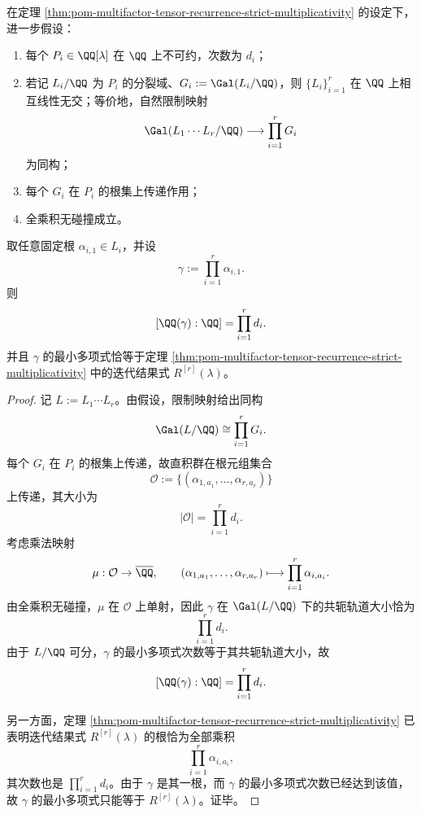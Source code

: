 \begin{theorem}\label{thm:pom-tensor-product-root-galois-degree-rigidity}
在定理 \ref{thm:pom-multifactor-tensor-recurrence-strict-multiplicativity} 的设定下，进一步假设：
\begin{enumerate}
  \item 每个 \(P_i\in\QQ[\lambda]\) 在 \(\QQ\) 上不可约，次数为 \(d_i\)；
  \item 若记 \(L_i/\QQ\) 为 \(P_i\) 的分裂域、\(G_i:=\Gal(L_i/\QQ)\)，则 \(\{L_i\}_{i=1}^{r}\) 在 \(\QQ\) 上相互线性无交；等价地，自然限制映射
  \[
  \Gal(L_1\cdots L_r/\QQ)\longrightarrow \prod_{i=1}^{r}G_i
  \]
  为同构；
  \item 每个 \(G_i\) 在 \(P_i\) 的根集上传递作用；
  \item 全乘积无碰撞成立。
\end{enumerate}
取任意固定根 \(\alpha_{i,1}\in L_i\)，并设
\[
\gamma:=\prod_{i=1}^{r}\alpha_{i,1}.
\]
则
\[
[\QQ(\gamma):\QQ]=\prod_{i=1}^{r}d_i.
\]
并且 \(\gamma\) 的最小多项式恰等于定理
\ref{thm:pom-multifactor-tensor-recurrence-strict-multiplicativity}
中的迭代结果式 \(R^{[r]}(\lambda)\)。
\end{theorem}
\begin{proof}
记 \(L:=L_1\cdots L_r\)。由假设，限制映射给出同构
\[
\Gal(L/\QQ)\cong \prod_{i=1}^{r}G_i.
\]
每个 \(G_i\) 在 \(P_i\) 的根集上传递，故直积群在根元组集合
\[
\mathcal O
:=
\{(\alpha_{1,a_1},\dots,\alpha_{r,a_r})\}
\]
上传递，其大小为
\[
|\mathcal O|=\prod_{i=1}^{r}d_i.
\]
考虑乘法映射
\[
\mu:\mathcal O\to \overline{\QQ},
\qquad
(\alpha_{1,a_1},\dots,\alpha_{r,a_r})
\longmapsto
\prod_{i=1}^{r}\alpha_{i,a_i}.
\]
由全乘积无碰撞，\(\mu\) 在 \(\mathcal O\) 上单射，因此 \(\gamma\) 在 \(\Gal(L/\QQ)\) 下的共轭轨道大小恰为
\[
\prod_{i=1}^{r}d_i.
\]
由于 \(L/\QQ\) 可分，\(\gamma\) 的最小多项式次数等于其共轭轨道大小，故
\[
[\QQ(\gamma):\QQ]=\prod_{i=1}^{r}d_i.
\]

另一方面，定理
\ref{thm:pom-multifactor-tensor-recurrence-strict-multiplicativity}
已表明迭代结果式 \(R^{[r]}(\lambda)\) 的根恰为全部乘积
\[
\prod_{i=1}^{r}\alpha_{i,a_i},
\]
其次数也是 \(\prod_{i=1}^{r}d_i\)。由于 \(\gamma\) 是其一根，而 \(\gamma\) 的最小多项式次数已经达到该值，故 \(\gamma\) 的最小多项式只能等于 \(R^{[r]}(\lambda)\)。证毕。
\end{proof}

\endinput
